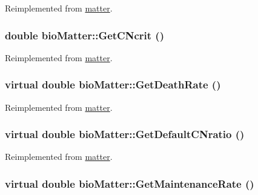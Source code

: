 Reimplemented from \hyperlink{classmatter_ae85f8f64ea546c5cbe056c641304b514}{matter}.\hypertarget{classbio_matter_ac8e514d722c9605efcf653fdc46b1d65}{
\subsubsection[{GetCNcrit}]{\setlength{\rightskip}{0pt plus 5cm}double bioMatter::GetCNcrit ()}}
\label{classbio_matter_ac8e514d722c9605efcf653fdc46b1d65}


Reimplemented from \hyperlink{classmatter_a111bf6b7c88f61e75ed50eac1fc8c3b7}{matter}.\hypertarget{classbio_matter_a78a7ead491fa0a5b799e672309dfca3e}{
\subsubsection[{GetDeathRate}]{\setlength{\rightskip}{0pt plus 5cm}virtual double bioMatter::GetDeathRate ()}}
\label{classbio_matter_a78a7ead491fa0a5b799e672309dfca3e}


Reimplemented from \hyperlink{classmatter_a3abae42a1209403e4c6b31521cb4a847}{matter}.\hypertarget{classbio_matter_aee0b5cbabdff3103df0fb634c131a8a1}{
\subsubsection[{GetDefaultCNratio}]{\setlength{\rightskip}{0pt plus 5cm}virtual double bioMatter::GetDefaultCNratio ()}}
\label{classbio_matter_aee0b5cbabdff3103df0fb634c131a8a1}


Reimplemented from \hyperlink{classmatter_a96b0fe568fcecda260abc0a5d32ca3da}{matter}.\hypertarget{classbio_matter_af20366c312adfce4ae986a512043cfe7}{
\subsubsection[{GetMaintenanceRate}]{\setlength{\rightskip}{0pt plus 5cm}virtual double bioMatter::GetMaintenanceRate ()}}
\label{classbio_matter_af20366c312adfce4ae986a512043cfe7}


